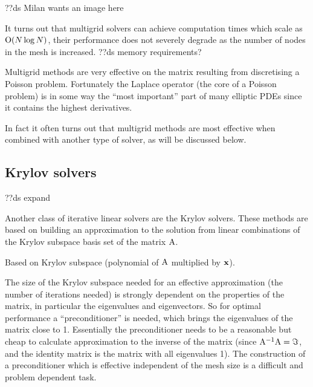 ??ds Milan wants an image here

It turns out that multigrid solvers can achieve computation times which scale as $\text{O}{\left( N \log N \right)}$, \ie their performance does not severely degrade as the number of nodes in the mesh is increased.
??ds memory requirements?

Multigrid methods are very effective on the matrix resulting from discretising a Poisson problem.
Fortunately the Laplace operator (\ie the core of a Poisson problem) is in some way the ``most important'' part of many elliptic PDEs since it contains the highest derivatives.

In fact it often turns out that multigrid methods are most effective when combined with another type of solver, as will be discussed below.


\subsection{Krylov solvers}
\label{sec:krylov-solvers}

??ds expand

Another class of iterative linear solvers are the Krylov solvers.
These methods are based on building an approximation to the solution from linear combinations of the Krylov subspace basis set of the matrix $\mathrm{A}$.

Based on Krylov subspace (polynomial of $\mathrm{A}$ multiplied by $\mathbf{x}$).

The size of the Krylov subspace needed for an effective approximation (\ie the number of iterations needed) is strongly dependent on the properties of the matrix, in particular the eigenvalues and eigenvectors.
So for optimal performance a ``preconditioner'' is needed, which brings the eigenvalues of the matrix close to 1.
Essentially the preconditioner needs to be a reasonable but cheap to calculate approximation to the inverse of the matrix (since $\mathrm{A}^{-1}\mathrm{A} = \Im$, and the identity matrix is the matrix with all eigenvalues 1).
The construction of a preconditioner which is effective independent of the mesh size is a difficult and problem dependent task. 




